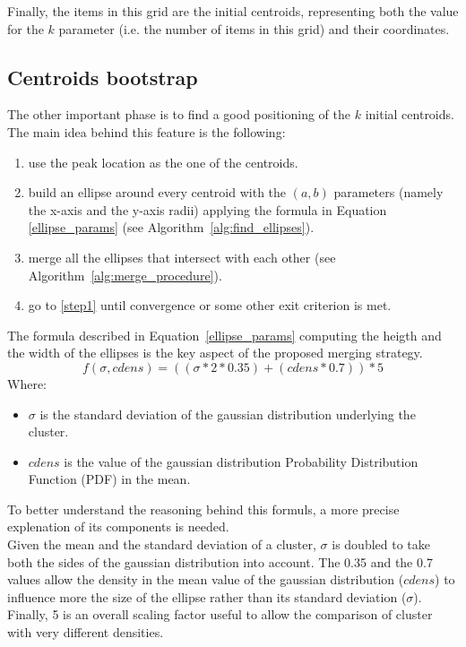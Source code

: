 Finally, the items in this grid are the initial centroids, representing both the value for the
$k$ parameter (i.e. the number of items in this grid) and their coordinates.


\subsection{Centroids bootstrap}
The other important phase is to find a good positioning of the $k$ initial centroids.
The main idea behind this feature is the following:
\begin{enumerate}
    \item \label{step1} use the peak location as the one of the centroids.
    \item build an ellipse around every centroid with the $(a,b)$ parameters (namely the x-axis
        and the y-axis radii) applying the formula in Equation \ref{ellipse_params} (see
        Algorithm~\ref{alg:find_ellipses}).
    \item merge all the ellipses that intersect with each other (see 
        Algorithm~\ref{alg:merge_procedure}).
    \item go to \ref{step1} until convergence or some other exit criterion is met.
\end{enumerate}




The formula described in Equation~\ref{ellipse_params} computing the heigth and the width of 
the ellipses is the key aspect of the proposed merging strategy.
\begin{equation}
\label{ellipse_params}
    f(\sigma, cdens) = ((\sigma * 2 * 0.35) + (cdens * 0.7)) * 5
\end{equation}
Where:
\begin{itemize}
    \item $\sigma$ is the standard deviation of the gaussian distribution underlying the cluster.
    \item $cdens$ is the value of the gaussian distribution Probability Distribution Function (PDF)
        in the mean.
\end{itemize}

To better understand the reasoning behind this formuls, a more precise explenation of its components
is needed.\\
Given the mean and the standard deviation of a cluster, 
$\sigma$ is doubled to take both the sides of the gaussian distribution into account.
The 0.35 and the 0.7 values allow the density in the mean value of the gaussian distribution ($cdens$) 
to influence more the size of the ellipse rather than its standard deviation ($\sigma$). Finally, 5 is
an overall scaling factor useful to allow the comparison of cluster with very different densities.

